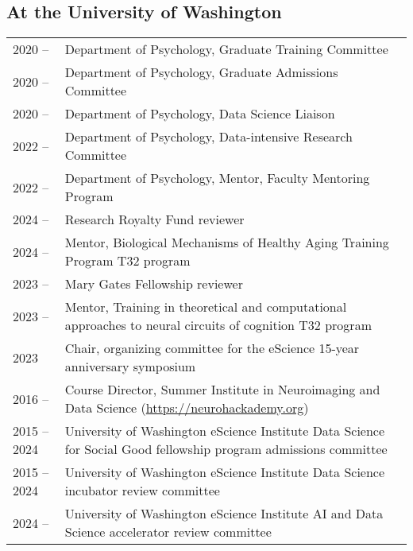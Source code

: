 \documentclass[11pt,fullpage]{article}
\begin{document}
\subsection*{At the University of Washington}
\begin{tabular}{p{}p{}}
2020 -- & Department of Psychology, Graduate Training Committee\\
2020 -- & Department of Psychology, Graduate Admissions Committee\\
2020 -- & Department of Psychology, Data Science Liaison\\
2022 -- & Department of Psychology, Data-intensive Research Committee\\
2022 -- & Department of Psychology, Mentor, Faculty Mentoring Program\\
2024 -- & Research Royalty Fund reviewer \\
2024 -- & Mentor, Biological Mechanisms of Healthy Aging Training Program T32 program\\
2023 -- & Mary Gates Fellowship reviewer\\
2023 -- & Mentor, Training in theoretical and computational approaches to neural circuits of cognition T32 program\\
2023 & Chair, organizing committee for the eScience 15-year anniversary symposium\\
2016 -- & Course Director, Summer Institute in Neuroimaging and Data Science (\url{https://neurohackademy.org})\\
2015 -- 2024 & University of Washington eScience Institute Data Science for Social Good fellowship program admissions committee\\
2015 -- 2024 & University of Washington eScience Institute Data Science incubator review committee\\
2024 -- & University of Washington eScience Institute AI and Data Science accelerator review committee\\
\end{tabular}
\end{document}
